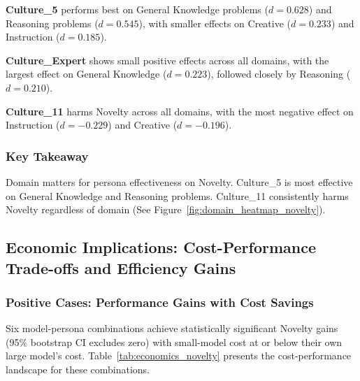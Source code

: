 \documentclass{article}
\begin{document}
\textbf{Culture\_5} performs best on General Knowledge problems ($d = 0.628$) and Reasoning problems ($d = 0.545$), with smaller effects on Creative ($d = 0.233$) and Instruction ($d = 0.185$).

\textbf{Culture\_Expert} shows small positive effects across all domains, with the largest effect on General Knowledge ($d = 0.223$), followed closely by Reasoning ($d = 0.210$).

\textbf{Culture\_11} harms Novelty across all domains, with the most negative effect on Instruction ($d = -0.229$) and Creative ($d = -0.196$).

\subsubsection{Key Takeaway}

Domain matters for persona effectiveness on Novelty. Culture\_5 is most effective on General Knowledge and Reasoning problems. Culture\_11 consistently harms Novelty regardless of domain (See Figure~\ref{fig:domain_heatmap_novelty}).

\subsection{Economic Implications: Cost-Performance Trade-offs and Efficiency Gains}

\subsubsection{Positive Cases: Performance Gains with Cost Savings}

Six model-persona combinations achieve statistically significant Novelty gains (95\% bootstrap CI excludes zero) with small-model cost at or below their own large model's cost. Table~\ref{tab:economics_novelty} presents the cost-performance landscape for these combinations.
\end{document}

